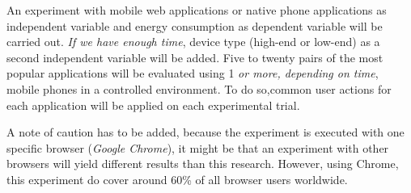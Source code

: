An experiment with mobile web applications or native phone applications as independent variable and energy consumption as dependent variable will be carried out. \textit{If we have enough time}, device type (high-end or low-end) as a second independent variable will be added. Five to twenty pairs of the most popular applications will be evaluated using 1 \textit{or more, depending on time}, mobile phones in a controlled environment. To do so,common user actions for each application will be applied on each experimental trial.

A note of caution has to be added, because the experiment is executed with one specific browser (\textit{Google Chrome}), it might be that an experiment with other browsers will yield different results than this research. However, using Chrome, this experiment do cover around 60\% of all browser users worldwide. \cite{Chromestats}